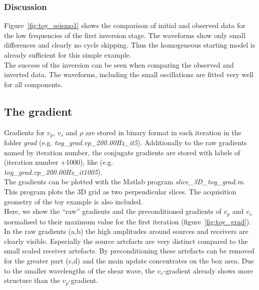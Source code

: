 \subsubsection*{Discussion}
Figure~\ref{fig:toy_seismo1} shows the comparison of initial and observed data for the low frequencies of the first inversion stage. The waveforms show only small differences and clearly no cycle skipping. Thus the homogeneous starting model is already sufficient for this simple example. \\
The success of the inversion can be seen when comparing the observed and inverted data. The waveforms, including the small oscillations are fitted very well for all components.
\subsection{The gradient} 
Gradients for $v_p$, $v_s$ and $\rho$ are stored in binary format in each iteration in the folder \textit{grad} (e.g. \textit{toy\_grad.vp\_200.00Hz\_it5}). Additionally to the raw gradients named by iteration number, the conjugate gradients are stored with labels of (iteration number +1000), like  (e.g. \\ \textit{toy\_grad.vp\_200.00Hz\_it1005}). \\
The gradients can be plotted with the Matlab program \textit{slice\_3D\_toy\_grad.m}. This program plots the 3D grid as two perpendicular slices. The acquisition geometry of the toy example is also included. \\
Here, we show the ``raw'' gradients and the preconditioned gradients of $v_p$ and $v_s$ normalised to their maximum value for the first iteration (figure~\ref{fig:toy_grad}). In the raw gradients (a,b) the high amplitudes around sources and receivers are clearly visible. Especially the source artefacts are very distinct compared to the small scaled receiver artefacts. By preconditioning these artefacts can be removed for the greater part (c,d) and the main update concentrates on the box area. Due to the smaller wavelengths of the shear wave, the $v_s$-gradient already shows more structure than the $v_p$-gradient. 
